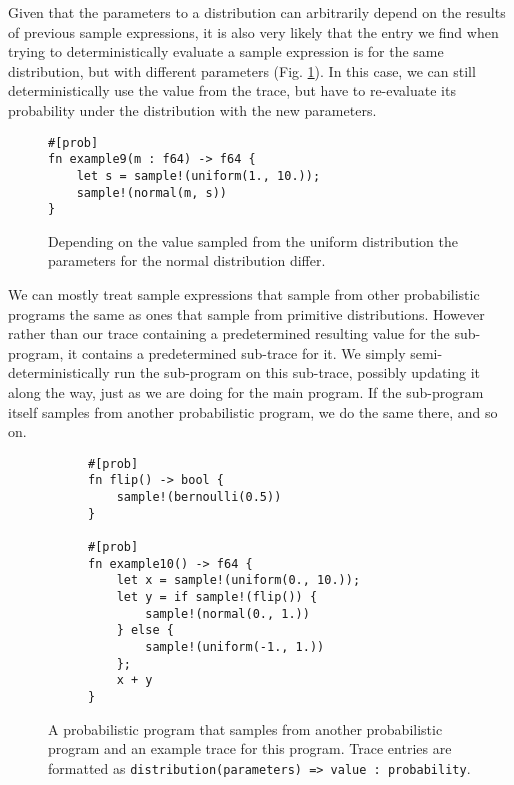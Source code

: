 Given that the parameters to a distribution can arbitrarily depend on the results of previous sample expressions, it is also very likely that the entry we find when trying to deterministically evaluate a sample expression is for the same distribution, but with different parameters (Fig. \ref{example9}). In this case, we can still deterministically use the value from the trace, but have to re-evaluate its probability under the distribution with the new parameters.

\begin{figure}[h]
\begin{lstlisting}
#[prob]
fn example9(m : f64) -> f64 {
    let s = sample!(uniform(1., 10.));
    sample!(normal(m, s))
}
\end{lstlisting}
\caption{Depending on the value sampled from the uniform distribution the parameters for the normal distribution differ.}
\label{example9}
\end{figure}

We can mostly treat sample expressions that sample from other probabilistic programs the same as ones that sample from primitive distributions. However rather than our trace containing a predetermined resulting value for the sub-program, it contains a predetermined sub-trace for it. We simply semi-deterministically run the sub-program on this sub-trace, possibly updating it along the way, just as we are doing for the main program. If the sub-program itself samples from another probabilistic program, we do the same there, and so on.

\begin{figure}[h]
\begin{subfigure}{0.5\textwidth}
\begin{lstlisting}
#[prob]
fn flip() -> bool {
    sample!(bernoulli(0.5))
}

#[prob]
fn example10() -> f64 {
    let x = sample!(uniform(0., 10.));
    let y = if sample!(flip()) {
        sample!(normal(0., 1.))
    } else {
        sample!(uniform(-1., 1.))
    };
    x + y
}
\end{lstlisting}
\end{subfigure}
\begin{subfigure}{0.55\textwidth}
\end{subfigure}
\caption{A probabilistic program that samples from another probabilistic program and an example trace for this program. Trace entries are formatted as \lstinline{distribution(parameters) => value : probability}.}
\label{example10}
\end{figure}

